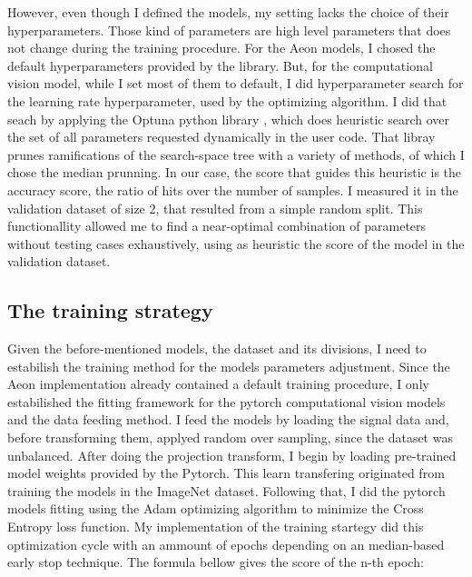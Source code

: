 



However, even though I defined the models, my setting lacks the choice of their hyperparameters. Those kind of parameters are high level parameters that does not change during the training procedure. For the Aeon models, I chosed the default hyperparameters provided by the library. But, for the computational vision model, while I set most of them to default, I did hyperparameter search for the learning rate hyperparameter, used by the optimizing algorithm. I did that seach by applying the Optuna python library \cite{OptunaDoc}, which does heuristic search over the set of all parameters requested dynamically in the user code. That libray prunes ramifications of the search-space tree with a variety of methods, of which I chose the median prunning. In our case, the score that guides this heuristic is the accuracy score, the ratio of hits over the number of samples. I measured it in the validation dataset of size 2, that resulted from a simple random split. This functionallity allowed me to find a near-optimal combination of parameters without testing cases exhaustively, using as heuristic the score of the model in the validation dataset.

\subsection{The training strategy}

Given the before-mentioned models, the dataset and its divisions, I need to estabilish the training method for the models parameters adjustment. Since the Aeon implementation already contained a default training procedure, I only estabilished the fitting framework for the pytorch computational vision models and the data feeding method. I feed the models by loading the signal data and, before transforming them, applyed random over sampling, since the dataset was unbalanced. After doing the projection transform, I begin by loading pre-trained model weights provided by the Pytorch. This learn transfering originated from training the models in the ImageNet \cite{ImageNet} dataset. Following that, I did the pytorch models fitting using the Adam optimizing algorithm \cite{Adam} to minimize the Cross Entropy loss function. My implementation of the training startegy did this optimization cycle with an ammount of epochs depending on an median-based early stop technique. The formula bellow gives the score of the n-th epoch:

